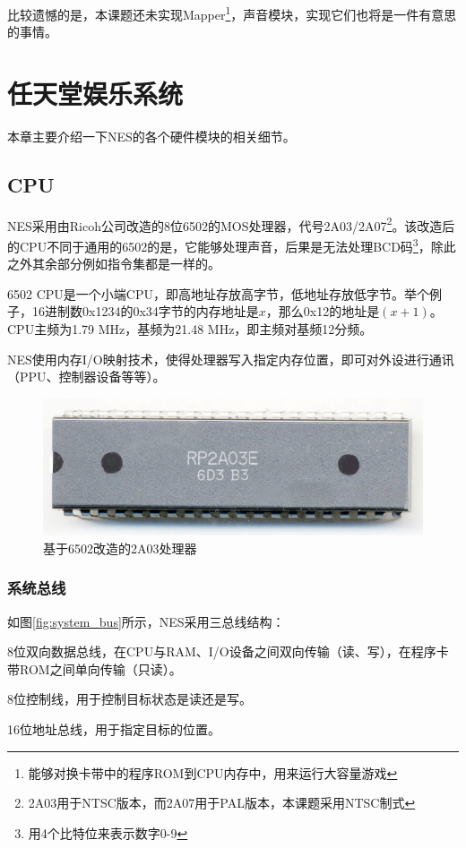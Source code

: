 \documentclass[a4paper]{ltxdoc}
\begin{document}
{比较遗憾的是，本课题还未实现Mapper\footnote{能够对换卡带中的程序ROM到CPU内存中，用来运行大容量游戏}，声音模块，实现它们也将是一件有意思的事情。

\section{任天堂娱乐系统}
本章主要介绍一下NES的各个硬件模块的相关细节。

\subsection{CPU}
NES采用由Ricoh公司改造的8位6502的MOS处理器，代号2A03/2A07\footnote{2A03用于NTSC版本，而2A07用于PAL版本，本课题采用NTSC制式}。该改造后的CPU不同于通用的6502的是，它能够处理声音，后果是无法处理BCD码\footnote{用4个比特位来表示数字0-9}，除此之外其余部分例如指令集都是一样的。

6502 CPU是一个小端CPU，即高地址存放高字节，低地址存放低字节。举个例子，16进制数0x1234的0x34字节的内存地址是$x$，那么0x12的地址是$(x+1)$。CPU主频为1.79 MHz，基频为21.48 MHz，即主频对基频12分频。

NES使用内存I/O映射技术，使得处理器写入指定内存位置，即可对外设进行通讯（PPU、控制器设备等等）。

\begin{figure}[h]
	\centering
	\includegraphics{images/RP2A03E.jpg}
	\caption{基于6502改造的2A03处理器}
	\label{fig:2a03}
\end{figure}

\subsubsection{系统总线}
如图\ref{fig:system_bus}所示，NES采用三总线结构：
\begin{description}[align=left]
	\item [数据总线] 8位双向数据总线，在CPU与RAM、I/O设备之间双向传输（读、写），在程序卡带ROM之间单向传输（只读）。
	\item [控制总线] 8位控制线，用于控制目标状态是读还是写。
	\item [地址总线] 16位地址总线，用于指定目标的位置。
\end{description}

}
\end{document}
